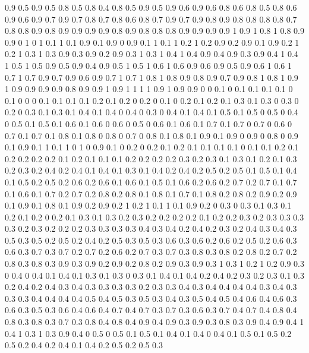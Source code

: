 0.9 0.5
0.9 0.5
0.8 0.5
0.8 0.4
0.8 0.5
0.9 0.5
0.9 0.6
0.9 0.6
0.8 0.6
0.8 0.5
0.8 0.6
0.9 0.6
0.9 0.7
0.9 0.7
0.8 0.7
0.8 0.6
0.8 0.7
0.9 0.7
0.9 0.8
0.9 0.8
0.8 0.8
0.8 0.7
0.8 0.8
0.9 0.8
0.9 0.9
0.9 0.9
0.8 0.9
0.8 0.8
0.8 0.9
0.9 0.9
0.9 1
0.9 1
0.8 1
0.8 0.9
0.9 0
1 0
1 0.1
1 0.1
0.9 0.1
0.9 0
0.9 0.1
1 0.1
1 0.2
1 0.2
0.9 0.2
0.9 0.1
0.9 0.2
1 0.2
1 0.3
1 0.3
0.9 0.3
0.9 0.2
0.9 0.3
1 0.3
1 0.4
1 0.4
0.9 0.4
0.9 0.3
0.9 0.4
1 0.4
1 0.5
1 0.5
0.9 0.5
0.9 0.4
0.9 0.5
1 0.5
1 0.6
1 0.6
0.9 0.6
0.9 0.5
0.9 0.6
1 0.6
1 0.7
1 0.7
0.9 0.7
0.9 0.6
0.9 0.7
1 0.7
1 0.8
1 0.8
0.9 0.8
0.9 0.7
0.9 0.8
1 0.8
1 0.9
1 0.9
0.9 0.9
0.9 0.8
0.9 0.9
1 0.9
1 1
1 1
0.9 1
0.9 0.9
0 0
0.1 0
0.1 0.1
0.1 0.1
0 0.1
0 0
0 0.1
0.1 0.1
0.1 0.2
0.1 0.2
0 0.2
0 0.1
0 0.2
0.1 0.2
0.1 0.3
0.1 0.3
0 0.3
0 0.2
0 0.3
0.1 0.3
0.1 0.4
0.1 0.4
0 0.4
0 0.3
0 0.4
0.1 0.4
0.1 0.5
0.1 0.5
0 0.5
0 0.4
0 0.5
0.1 0.5
0.1 0.6
0.1 0.6
0 0.6
0 0.5
0 0.6
0.1 0.6
0.1 0.7
0.1 0.7
0 0.7
0 0.6
0 0.7
0.1 0.7
0.1 0.8
0.1 0.8
0 0.8
0 0.7
0 0.8
0.1 0.8
0.1 0.9
0.1 0.9
0 0.9
0 0.8
0 0.9
0.1 0.9
0.1 1
0.1 1
0 1
0 0.9
0.1 0
0.2 0
0.2 0.1
0.2 0.1
0.1 0.1
0.1 0
0.1 0.1
0.2 0.1
0.2 0.2
0.2 0.2
0.1 0.2
0.1 0.1
0.1 0.2
0.2 0.2
0.2 0.3
0.2 0.3
0.1 0.3
0.1 0.2
0.1 0.3
0.2 0.3
0.2 0.4
0.2 0.4
0.1 0.4
0.1 0.3
0.1 0.4
0.2 0.4
0.2 0.5
0.2 0.5
0.1 0.5
0.1 0.4
0.1 0.5
0.2 0.5
0.2 0.6
0.2 0.6
0.1 0.6
0.1 0.5
0.1 0.6
0.2 0.6
0.2 0.7
0.2 0.7
0.1 0.7
0.1 0.6
0.1 0.7
0.2 0.7
0.2 0.8
0.2 0.8
0.1 0.8
0.1 0.7
0.1 0.8
0.2 0.8
0.2 0.9
0.2 0.9
0.1 0.9
0.1 0.8
0.1 0.9
0.2 0.9
0.2 1
0.2 1
0.1 1
0.1 0.9
0.2 0
0.3 0
0.3 0.1
0.3 0.1
0.2 0.1
0.2 0
0.2 0.1
0.3 0.1
0.3 0.2
0.3 0.2
0.2 0.2
0.2 0.1
0.2 0.2
0.3 0.2
0.3 0.3
0.3 0.3
0.2 0.3
0.2 0.2
0.2 0.3
0.3 0.3
0.3 0.4
0.3 0.4
0.2 0.4
0.2 0.3
0.2 0.4
0.3 0.4
0.3 0.5
0.3 0.5
0.2 0.5
0.2 0.4
0.2 0.5
0.3 0.5
0.3 0.6
0.3 0.6
0.2 0.6
0.2 0.5
0.2 0.6
0.3 0.6
0.3 0.7
0.3 0.7
0.2 0.7
0.2 0.6
0.2 0.7
0.3 0.7
0.3 0.8
0.3 0.8
0.2 0.8
0.2 0.7
0.2 0.8
0.3 0.8
0.3 0.9
0.3 0.9
0.2 0.9
0.2 0.8
0.2 0.9
0.3 0.9
0.3 1
0.3 1
0.2 1
0.2 0.9
0.3 0
0.4 0
0.4 0.1
0.4 0.1
0.3 0.1
0.3 0
0.3 0.1
0.4 0.1
0.4 0.2
0.4 0.2
0.3 0.2
0.3 0.1
0.3 0.2
0.4 0.2
0.4 0.3
0.4 0.3
0.3 0.3
0.3 0.2
0.3 0.3
0.4 0.3
0.4 0.4
0.4 0.4
0.3 0.4
0.3 0.3
0.3 0.4
0.4 0.4
0.4 0.5
0.4 0.5
0.3 0.5
0.3 0.4
0.3 0.5
0.4 0.5
0.4 0.6
0.4 0.6
0.3 0.6
0.3 0.5
0.3 0.6
0.4 0.6
0.4 0.7
0.4 0.7
0.3 0.7
0.3 0.6
0.3 0.7
0.4 0.7
0.4 0.8
0.4 0.8
0.3 0.8
0.3 0.7
0.3 0.8
0.4 0.8
0.4 0.9
0.4 0.9
0.3 0.9
0.3 0.8
0.3 0.9
0.4 0.9
0.4 1
0.4 1
0.3 1
0.3 0.9
0.4 0
0.5 0
0.5 0.1
0.5 0.1
0.4 0.1
0.4 0
0.4 0.1
0.5 0.1
0.5 0.2
0.5 0.2
0.4 0.2
0.4 0.1
0.4 0.2
0.5 0.2
0.5 0.3
